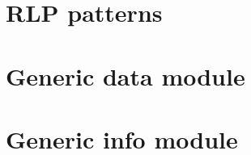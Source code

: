 \documentclass[fleqn]{report}
\begin{document}
\chapter{RLP patterns}                               \label{chap: RLP patterns}    \minitoc    
\chapter{Generic data module}                        \label{chap: generic data}    \minitoc    
\chapter{Generic info module}                        \label{chap: generic info}    \minitoc    
\printbibliography
\end{document}
